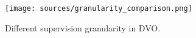 \begin{figure}[t]
    \centering\small
    \setlength{\abovecaptionskip}{6pt}  
    \texttt{[image: sources/granularity\_comparison.png]}
    \vspace{-5pt}
    \caption{Different supervision granularity in DVO.}
    \label{fig:value_granularity_comparison}
\end{figure}